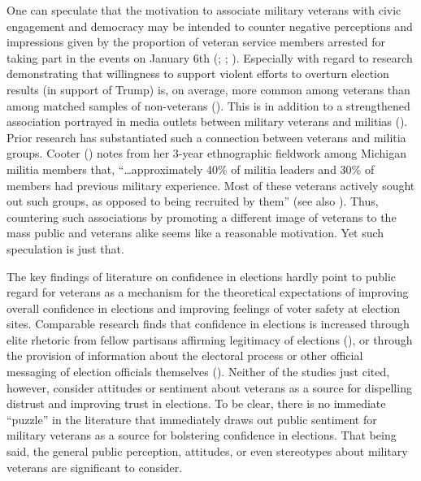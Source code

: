 \documentclass[
  12pt,
  letterpaper,
]{article}
\begin{document}
One can speculate that the motivation to associate military veterans
with civic engagement and democracy may be intended to counter negative
perceptions and impressions given by the proportion of veteran service
members arrested for taking part in the events on January 6th
(;
;
). Especially with
regard to research demonstrating that willingness to support violent
efforts to overturn election results (in support of Trump) is, on
average, more common among veterans than among matched samples of
non-veterans (). This is in
addition to a strengthened association portrayed in media outlets
between military veterans and militias
(). Prior research has
substantiated such a connection between veterans and militia groups.
Cooter () notes from her 3-year
ethnographic fieldwork among Michigan militia members that,
``\ldots approximately 40\% of militia leaders and 30\% of members had
previous military experience. Most of these veterans actively sought out
such groups, as opposed to being recruited by them'' (see also
). Thus, countering such
associations by promoting a different image of veterans to the mass
public and veterans alike seems like a reasonable motivation. Yet such
speculation is just that.

The key findings of literature on confidence in elections hardly point
to public regard for veterans as a mechanism for the theoretical
expectations of improving overall confidence in elections and improving
feelings of voter safety at election sites. Comparable research finds
that confidence in elections is increased through elite rhetoric from
fellow partisans affirming legitimacy of elections
(), or through the
provision of information about the electoral process or other official
messaging of election officials themselves
(). Neither of the
studies just cited, however, consider attitudes or sentiment about
veterans as a source for dispelling distrust and improving trust in
elections. To be clear, there is no immediate ``puzzle'' in the
literature that immediately draws out public sentiment for military
veterans as a source for bolstering confidence in elections. That being
said, the general public perception, attitudes, or even stereotypes
about military veterans are significant to consider.
\end{document}
